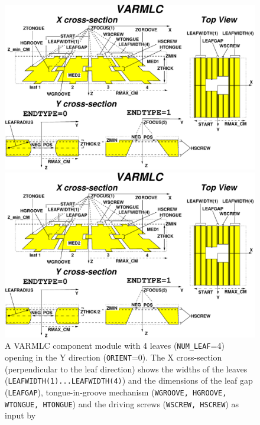 \documentclass[12pt,twoside]{article}
\begin{document}
\newpage
\begin{figure}[tp]
\begin{center}
\leavevmode
\begin{latexonly}
\includegraphics[width=18cm]{figures/varmlcd}
\end{latexonly}
\begin{htmlonly}
\includegraphics[width=13cm]{figures/varmlcd}
\end{htmlonly}
\end{center}
\caption[VARMLC CM geometry]
{A VARMLC component module with 4 leaves ({\tt NUM\_LEAF}=4) opening in the Y
direction ({\tt ORIENT}=0).  The X cross-section (perpendicular to
the leaf direction) shows the widths of the leaves
({\tt LEAFWIDTH(1)...LEAFWIDTH(4)}) and the dimensions of
the leaf gap ({\tt LEAFGAP}), tongue-in-groove mechanism ({\tt WGROOVE, HGROOVE,
WTONGUE, HTONGUE}) and the driving screws ({\tt WSCREW, HSCREW}) as input by
}
\end{figure}
\end{document}
